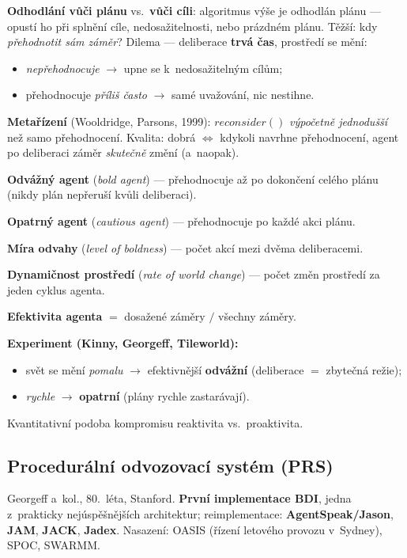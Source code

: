 \documentclass[11pt,a4paper]{article}
\theoremstyle{definition}
\begin{document}
\textbf{Odhodlání vůči plánu} vs.\ \textbf{vůči cíli}: algoritmus výše je odhodlán plánu ---
opustí ho při splnění cíle, nedosažitelnosti, nebo prázdném plánu. Těžší: kdy
\emph{přehodnotit sám záměr}? Dilema --- deliberace \textbf{trvá čas}, prostředí se mění:
\begin{itemize}
\item \emph{nepřehodnocuje} $\to$ upne se k~nedosažitelným cílům;
\item přehodnocuje \emph{příliš často} $\to$ samé uvažování, nic nestihne.
\end{itemize}

\textbf{Metařízení} (Wooldridge, Parsons, 1999): $\mathit{reconsider}()$ \emph{výpočetně
jednodušší} než samo přehodnocení. Kvalita: dobrá $\iff$ kdykoli navrhne přehodnocení, agent
po deliberaci záměr \emph{skutečně} změní (a~naopak).

\begin{defbox}
\textbf{Odvážný agent} (\emph{bold agent}) --- přehodnocuje až po dokončení celého plánu (nikdy
plán nepřeruší kvůli deliberaci).

\textbf{Opatrný agent} (\emph{cautious agent}) --- přehodnocuje po každé akci plánu.

\textbf{Míra odvahy} (\emph{level of boldness}) --- počet akcí mezi dvěma deliberacemi.

\textbf{Dynamičnost prostředí} (\emph{rate of world change}) --- počet změn prostředí za jeden
cyklus agenta.

\textbf{Efektivita agenta} $=$ dosažené záměry $/$ všechny záměry.
\end{defbox}

\textbf{Experiment (Kinny, Georgeff, Tileworld):}
\begin{itemize}
\item svět se mění \emph{pomalu} $\to$ efektivnější \textbf{odvážní} (deliberace $=$ zbytečná režie);
\item \emph{rychle} $\to$ \textbf{opatrní} (plány rychle zastarávají).
\end{itemize}
Kvantitativní podoba kompromisu reaktivita vs.\ proaktivita.

\subsection{Procedurální odvozovací systém (PRS)}
\label{ssec:prs}

\begin{defbox}
Georgeff a~kol., 80.~léta, Stanford. \textbf{První implementace BDI}, jedna z~prakticky
nejúspěšnějších architektur; reimplementace: \textbf{AgentSpeak/Jason}, \textbf{JAM},
\textbf{JACK}, \textbf{Jadex}. Nasazení: OASIS (řízení letového provozu v~Sydney), SPOC, SWARMM.
\end{defbox}
\end{document}
